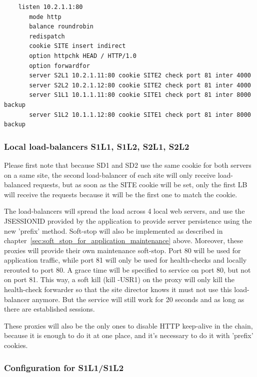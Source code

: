 \begin{verbatim}
    listen 10.2.1.1:80
       mode http
       balance roundrobin
       redispatch
       cookie SITE insert indirect
       option httpchk HEAD / HTTP/1.0
       option forwardfor
       server S2L1 10.2.1.11:80 cookie SITE2 check port 81 inter 4000
       server S2L2 10.2.1.12:80 cookie SITE2 check port 81 inter 4000
       server S1L1 10.1.1.11:80 cookie SITE1 check port 81 inter 8000 backup
       server S1L2 10.1.1.12:80 cookie SITE1 check port 81 inter 8000 backup
\end{verbatim}

\subsubsection{Local load-balancers S1L1, S1L2, S2L1, S2L2}

Please first note that because SD1 and SD2 use the same cookie for both
servers on a same site, the second load-balancer of each site will only
receive load-balanced requests, but as soon as the SITE cookie will be
set, only the first LB will receive the requests because it will be the
first one to match the cookie.

The load-balancers will spread the load across 4 local web servers, and
use the JSESSIONID provided by the application to provide server persistence
using the new 'prefix' method. Soft-stop will also be implemented as described
in chapter~\ref{sec:soft_stop_for_application_maintenance} above. Moreover, these proxies will provide their own maintenance
soft-stop. Port 80 will be used for application traffic, while port 81 will
only be used for health-checks and locally rerouted to port 80. A grace time
will be specified to service on port 80, but not on port 81. This way, a soft
kill (kill -USR1) on the proxy will only kill the health-check forwarder so
that the site director knows it must not use this load-balancer anymore. But
the service will still work for 20 seconds and as long as there are established
sessions.

These proxies will also be the only ones to disable HTTP keep-alive in the
chain, because it is enough to do it at one place, and it's necessary to do
it with 'prefix' cookies.

\subsubsection{Configuration for S1L1/S1L2}

